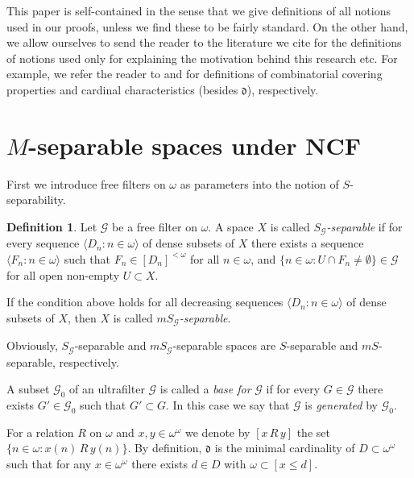 \documentclass[12pt,a4paper]{amsart}
\theoremstyle{definition}
\newtheorem{definition}[theorem]{Definition}
\newcommand{\w}{\omega}
\newcommand{\CG}{\mathcal{G}}
\newcommand{\la}{\langle}
\newcommand{\ra}{\rangle}
\newcommand{\hot}{\mathfrak}
\begin{document}
This paper is self-contained in the sense that we give definitions
of all notions used in our proofs, unless we find these to be fairly  standard.
On the other hand, {we allow ourselves} to send the reader to the literature we cite
for the definitions of notions used only for explaining the motivation behind this
research etc. For example, we
refer the reader to \cite{coc1,coc2} and \cite{Bla10} for definitions
of combinatorial covering properties and cardinal characteristics  (besides $\hot d$), respectively. 




\section{$M$-separable spaces under NCF}

First we introduce free filters on $\w$ as parameters into the notion 
of $S$-separability.

\begin{definition} \label{def0}
Let $\CG$  be a free filter on $\w$.
A space $X$ is called 
\emph{$S_{\CG}$-separable} if for every sequence
$\la D_n:n\in\w\ra$ of dense subsets of $X $ there exists a sequence
$\la F_n:n\in\w\ra$ such that $F_n\in [D_n]^{<\w}$ for all $n\in\w$,
and $\{n\in\w:U\cap F_n\neq\emptyset\}\in\CG$ for all open non-empty $U\subset X$.

If the condition above holds for all decreasing sequences
$\la D_n:n\in\w\ra$ of dense subsets of $X $, then $X$ is called 
\emph{$mS_{\CG}$-separable}.
\end{definition}

Obviously, $S_{\CG}$-separable and $mS_{\CG}$-separable spaces
are $S$-separable and $mS$-separable, respectively. 



A subset $\CG_0$ of an ultrafilter $\CG$ is called a \emph{base for}
$\CG$ if for every $G\in\CG$ there exists $G'\in\CG_0$ such that
$G'\subset G$. In this case we say that $\CG $ is \emph{generated} by $\CG_0$.

For a relation $R$ on $\w$ and $x,y\in\w^\w$ we denote by $[x\,R\,y]$
the set $\{n\in\w:x(n)\, R\, y(n)\}$. By definition, $\hot d$
is the minimal cardinality of  $D\subset\w^\w$ such that
for any $x\in\w^\w$ there exists $d\in D$ with $\w\subset [x\leq d]$. 
\end{document}
